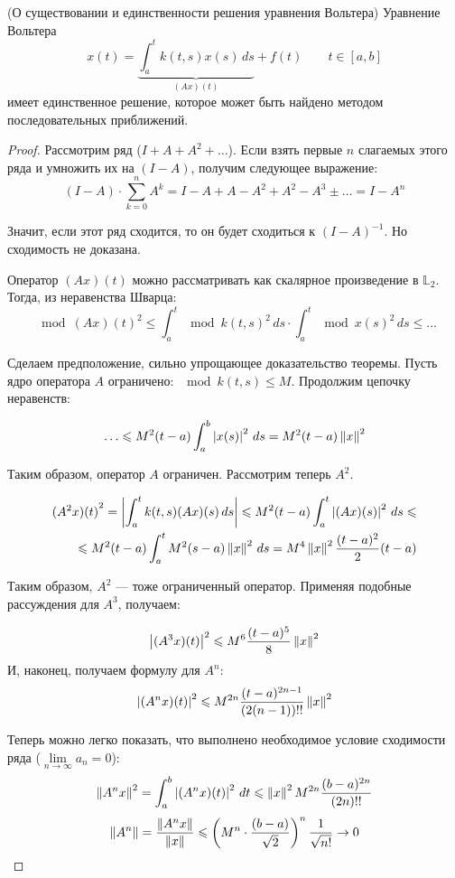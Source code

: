 \documentclass[12pt]{article}
\begin{document}
		\begin{theorem}
			(О существовании и единственности решения уравнения Вольтера)
			Уравнение Вольтера
			$$x(t) = \underbrace{\int_a^t k(t,s) x(s) \, ds}_{(Ax)(t)} + f(t) \qquad t\in [a,b]$$
			имеет единственное решение, которое может быть найдено методом последовательных приближений.
		\end{theorem}		
	
		\begin{proof}
			Рассмотрим ряд ($I + A + A^2 + \ldots$). Если взять первые $n$ слагаемых этого ряда и умножить их на $(I - A)$, 
			получим следующее выражение:
			$$(I-A) \cdot \sum_{k=0}^n A^k = I - A + A - A^2 + A^2 - A^3 \pm\ldots = I - A^n$$
		
			Значит, если этот ряд сходится, то он будет сходиться к $(I - A)^{-1}$. Но сходимость не доказана.
		
			Оператор $(Ax)(t)$ можно рассматривать как скалярное произведение в $\mathbb{L}_2$. Тогда, из неравенства Шварца:
			$$\mod{(Ax)(t)}^2 \leq 
			  \int_a^t \mod{k(t,s)}^2 \,ds \cdot \int_a^t \mod{x(s)}^2 \,ds \leq \ldots$$
			  
			Сделаем предположение, сильно упрощающее доказательство теоремы. Пусть ядро оператора $A$ 
			ограничено: $\mod{k(t,s)} \leq M$. Продолжим цепочку неравенств:
		
			$$\ldots \leqslant M^2(t-a) \int_a^b \left| x(s) \right|^2 \,ds = M^2(t-a)\left\| x \right\|^2$$
		
			Таким образом, оператор $A$ ограничен. Рассмотрим теперь $A^2$.
		
			\begin{align*}
				{(A^2x)(t)}^2 = \left| \int_a^t k(t,s)(Ax)(s) \,ds \right| \leqslant M^2(t-a)\int_a^t\left| (Ax)(s) \right|^2\,ds \leqslant \\ 
				\leqslant M^2(t-a)\int_a^tM^2(s-a)\left\| x \right\|^2 \,ds = M^4 \left\| x \right\|^2 \frac{(t-a)^2}{2}(t-a)
			\end{align*}
		
			Таким образом, $A^2$ --- тоже ограниченный оператор. Применяя подобные рассуждения для $A^3$, получаем:
		
			$$\left| (A^3x)(t) \right|^2 \leqslant M^6 \frac{(t-a)^5}{8}\left\| x \right\|^2 $$
			И, наконец, получаем формулу для $A^n$:
			$$\left| (A^nx)(t) \right|^2 \leqslant M^{2n} \frac{(t-a)^{2n-1}}{(2(n-1))!!}\left\| x \right\|^2 $$
		
			Теперь можно легко показать, что выполнено необходимое условие сходимости ряда 
			($\underset{n\rightarrow\infty}{\lim} a_n = 0$):
			$$\left\| A^nx \right\|^2 = \int_a^b \left| (A^nx)(t) \right|^2 \,dt \leqslant \left\| x \right\|^2 M^{2n} \frac{(b-a)^{2n}}{(2n)!!}$$
			$$\left\| A^n \right\| = \frac{\left\| A^nx \right\|}{\left\| x \right\|} \leqslant 
			  \left( M^n\cdot\frac{(b-a)}{\sqrt{2}}\right)^n \frac{1}{\sqrt{n!}} \rightarrow 0$$
			  

\end{proof}
\end{document}
